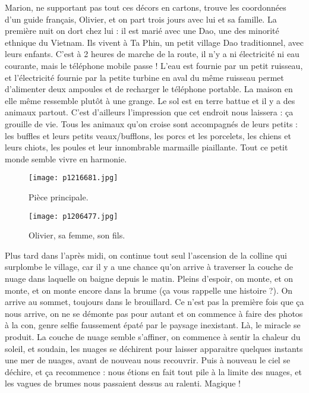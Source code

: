 \documentclass{book}
\begin{document}
Marion, ne supportant pas tout ces décors en cartons, trouve les coordonnées d'un guide français, Olivier, et on part trois jours avec lui et sa famille. La première nuit on dort chez lui : il est marié avec une Dao, une des minorité ethnique du Vietnam. Ils vivent à Ta Phin, un petit village Dao traditionnel, avec leurs enfants. C'est à 2 heures de marche de la route, il n'y a ni électricité ni eau courante, mais le téléphone mobile passe ! L'eau est fournie par un petit ruisseau, et l'électricité fournie par la petite turbine en aval du même ruisseau permet d'alimenter deux ampoules et de recharger le téléphone portable. La maison en elle même ressemble plutôt à une grange. Le sol est en terre battue et il y a des animaux partout. C'est d'ailleurs l'impression que cet endroit nous laissera : ça grouille de vie. Tous les animaux qu'on croise sont accompagnés de leurs petits : les buffles et leurs petits veaux/bufflons, les porcs et les porcelets, les chiens et leurs chiots, les poules et leur innombrable marmaille piaillante. Tout ce petit monde semble vivre en harmonie.


\begin{figure}[h]
\centering
\texttt{[image: p1216681.jpg]}
\caption*{Pièce principale.}
\end{figure}


\begin{figure}[h]
\centering
\texttt{[image: p1206477.jpg]}
\caption*{Olivier, sa femme, son fils.}
\end{figure}

Plus tard dans l'après midi, on continue tout seul l'ascension de la colline qui surplombe le village, car il y a une chance qu'on arrive à traverser la couche de nuage dans laquelle on baigne depuis le matin. Pleins d'espoir, on monte, et on monte, et on monte encore dans la brume (ça vous rappelle une histoire ?). On arrive au sommet, toujours dans le brouillard. Ce n'est pas la première fois que ça nous arrive, on ne se démonte pas pour autant et on commence à faire des photos à la con, genre selfie faussement épaté par le paysage inexistant. Là, le miracle se produit. La couche de nuage semble s'affiner, on commence à sentir la chaleur du soleil, et soudain, les nuages se déchirent pour laisser apparaitre quelques instants une mer de nuages, avant de nouveau nous recouvrir. Puis à nouveau le ciel se déchire, et ça recommence : nous étions en fait tout pile à la limite des nuages, et les vagues de brumes nous passaient dessus au ralenti. Magique !
\end{document}
